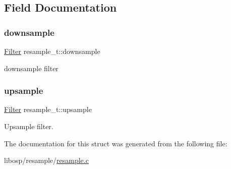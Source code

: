 \subsection{Field Documentation}
\mbox{\label{structresample__t_a24f8e6d91db22e6809c3be712a0a6437}} 
\subsubsection{\texorpdfstring{downsample}{downsample}}
{\footnotesize\ttfamily \mbox{\hyperlink{filter_8h_a69e34b8aa259d2ca0b81b5c95f395bdf}{Filter}} resample\+\_\+t\+::downsample}



downsample filter 

\mbox{\label{structresample__t_a7f06c113fbaa88f3f943e84358d05e45}} 
\subsubsection{\texorpdfstring{upsample}{upsample}}
{\footnotesize\ttfamily \mbox{\hyperlink{filter_8h_a69e34b8aa259d2ca0b81b5c95f395bdf}{Filter}} resample\+\_\+t\+::upsample}



Upsample filter. 



The documentation for this struct was generated from the following file\+:\begin{DoxyCompactItemize}
\item 
libosp/resample/\mbox{\hyperlink{resample_8c}{resample.\+c}}\end{DoxyCompactItemize}
